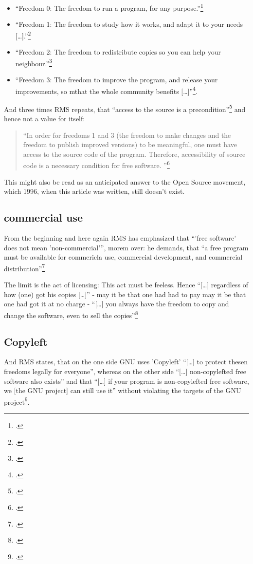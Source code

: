 \documentclass[DIV=calc,BCOR=5mm,11pt,headings=small,oneside,abstract=true, toc=bib]{scrartcl}
\begin{document}
\begin{itemize}
  \item \enquote{Freedom 0: The freedom to run a program, for any
  purpose.}\footcite[cf][41]{Stallman1996a}
  \item \enquote{Freedom 1: The freedom to study how it works, and adapt it
  to your needs [\ldots].}\footcite[cf][41]{Stallman1996a}
  \item \enquote{Freedom 2: The freedom to redistribute copies so you can
  help your neighbour.}\footcite[cf][41]{Stallman1996a}
  \item \enquote{Freedom 3: The freedom to improve the program, and release your
  improvements, so mthat the whole community benefits
  [\ldots]}\footcite[cf][41]{Stallman1996a}.
\end{itemize}

And three times RMS repeats, that \enquote{access to the source is a
precondition}\footcite[cf][41]{Stallman1996a} and hence not a value for
itself:
\begin{quote}
\enquote{In order for freedoms 1 and 3 (the freedom to make changes and the
freedom to publish improved versions) to be meaningful, one must have access to
the source code of the program. Therefore, accessibility of source code is a
necessary condition for free software.
}\footcite[cf][41]{Stallman1996a}
\end{quote}
This might also be read as an anticipated answer to the Open Source movement,
which 1996, when this article was written, still doesn't exist.

\subsection{commercial use}

From the beginning and here again RMS has emphasized that \enquote{'free
software' does not mean 'non-commercial'}, morem over: he demands, that
\enquote{a free program must be available for commericla use, commercial
development, and commercial distribution}\footcite[cf][42]{Stallman1996a}

The limit is the act of licensing: This act must be feeless. Hence
\enquote{[\ldots] regardless of how (one) got his copies [\ldots]} - may it
be that one had had to pay may it be that one had got it at no charge -
\enquote{[\ldots] you always have the freedom to copy and change the
software, even to sell the copies}\footcite[cf][42]{Stallman1996a}

\subsection{Copyleft}

And RMS states, that on the one side GNU uses 'Copyleft' \enquote{[\ldots] to
protect thesen freedoms legally for everyone}, whereas on the other side
\enquote{[\ldots] non-copylefted free software also exists} and that
\enquote{[\ldots] if your program is non-copylefted free software, we [the
GNU project] can still use it} without violating the targets of the GNU
project\footcite[cf][42]{Stallman1996a}.

\small

\end{document}
